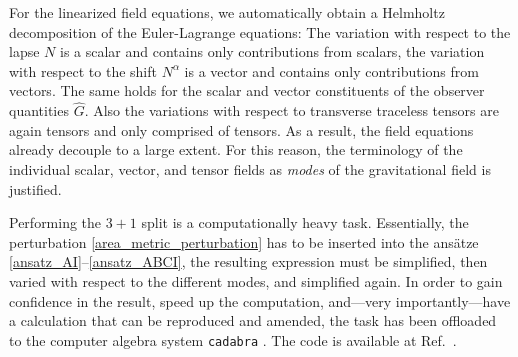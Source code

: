 For the linearized field equations, we automatically obtain a Helmholtz decomposition of the Euler-Lagrange equations: The variation with respect to the lapse $N$ is a scalar and contains only contributions from scalars, the variation with respect to the shift $N^\alpha$ is a vector and contains only contributions from vectors. The same holds for the scalar and vector constituents of the observer quantities $\hat G$. Also the variations with respect to transverse traceless tensors are again tensors and only comprised of tensors. As a result, the field equations already decouple to a large extent. For this reason, the terminology of the individual scalar, vector, and tensor fields as \emph{modes} of the gravitational field is justified.

Performing the $3+1$ split is a computationally heavy task. Essentially, the perturbation \eqref{area_metric_perturbation} has to be inserted into the ansätze \eqref{ansatz_AI}--\eqref{ansatz_ABCI}, the resulting expression must be simplified, then varied with respect to the different modes, and simplified again. In order to gain confidence in the result, speed up the computation, and---very importantly---have a calculation that can be reproduced and amended, the task has been offloaded to the computer algebra system \texttt{cadabra} \cite{Peeters2007,Peeters_2018}. The code is available at Ref.\ \cite{Alex_2020_area-metric-gravity}.

